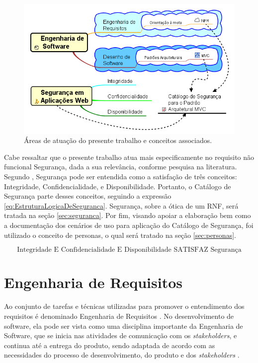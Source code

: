 \pagebreak

\begin{figure}[h!]
	\centering
	\includegraphics[keepaspectratio=true,scale=0.8]{figuras/bigPicture.png}
	\caption{Áreas de atuação do presente trabalho e conceitos associados.}
	\label{BigPicture}
\end{figure}

Cabe ressaltar que o presente trabalho atua mais especificamente no requisito não funcional Segurança, dada a sua relevância, conforme pesquisa na literatura. Segundo \cite{chung2012non}, Segurança pode ser entendida como a satisfação de três conceitos: Integridade, Confidencialidade, e Disponibilidade. Portanto, o Catálogo de Segurança parte desses conceitos, seguindo a expressão \ref{eq:EstruturaLogicaDeSeguranca}. Segurança, sobre a ótica de um RNF, será tratada na seção \ref{sec:seguranca}. Por fim, visando apoiar a elaboração bem como a documentação dos cenários de uso para aplicação do Catálogo de Segurança, foi utilizado o conceito de personas, o qual será tratado na seção \ref{sec:personas}.

\begin{equation}
	\label{eq:EstruturaLogicaDeSeguranca}
	\textrm{Integridade E Confidencialidade E Disponibilidade SATISFAZ Segurança}
\end{equation}

\section{Engenharia de Requisitos}
\label{sec:requisitos}

Ao conjunto de tarefas e técnicas utilizadas para promover o entendimento dos requisitos é denominado Engenharia de Requisitos \cite{pressman2011engenharia}. No desenvolvimento de software, ela pode ser vista como uma disciplina importante da Engenharia de Software, que se inicia nas atividades de comunicação com os \textit{stakeholders}, e continua até a entrega do produto, sendo adaptada de acordo com as necessidades do processo de desenvolvimento, do produto e dos \textit{stakeholders} \cite{pressman2011engenharia}.

